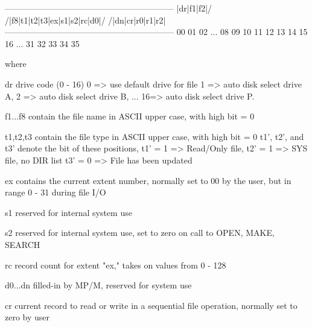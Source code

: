   ------------------------------------------------------------
  |dr|f1|f2|/ /|f8|t1|t2|t3|ex|s1|s2|rc|d0|/ /|dn|cr|r0|r1|r2|
  ------------------------------------------------------------
   00 01 02 ... 08 09 10 11 12 13 14 15 16 ... 31 32 33 34 35

where

   dr        drive code (0 - 16)
             0 => use default drive for file
             1 => auto disk select drive A,
             2 => auto disk select drive B,
             ...
             16=> auto disk select drive P.

   f1...f8   contain the file name in ASCII
             upper case, with high bit = 0

   t1,t2,t3  contain the file type in ASCII
             upper case, with high bit = 0
             t1', t2', and t3' denote the
             bit of these positions,
             t1' = 1 => Read/Only file,
             t2' = 1 => SYS file, no DIR list
             t3' = 0 => File has been updated

    ex       contains the current extent number,
             normally set to 00 by the user, but
             in range 0 - 31 during file I/O

    s1       reserved for internal system use

    s2       reserved for internal system use, set
             to zero on call to OPEN, MAKE, SEARCH

    rc       record count for extent "ex,"
             takes on values from 0 - 128

    d0...dn  filled-in by MP/M, reserved for
             system use

    cr       current record to read or write in
             a sequential file operation, normally
             set to zero by user

